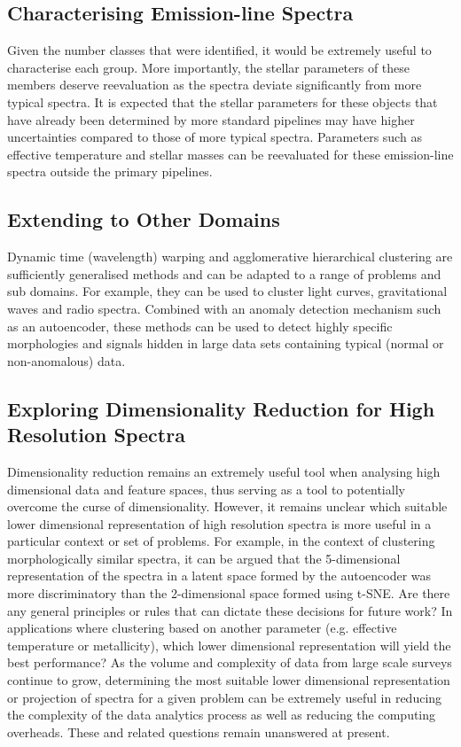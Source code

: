 \subsection{Characterising Emission-line Spectra}

Given the number classes that were identified, it would be extremely useful to characterise each group. More importantly, the stellar parameters of these members deserve reevaluation as the spectra deviate significantly from more typical spectra. It is expected that the stellar parameters for these objects that have already been determined by more standard pipelines may have higher uncertainties compared to those of more typical spectra. Parameters such as effective temperature and stellar masses can be reevaluated for these emission-line spectra outside the primary pipelines.

\subsection{Extending to Other Domains}

Dynamic time (wavelength) warping and agglomerative hierarchical clustering are sufficiently generalised methods and can be adapted to a range of problems and sub domains. For example, they can be used to cluster light curves, gravitational waves and radio spectra. Combined with an anomaly detection mechanism such as an autoencoder, these methods can be used to detect highly specific morphologies and signals hidden in large data sets containing typical (normal or non-anomalous) data. 

\subsection{Exploring Dimensionality Reduction for High Resolution Spectra}

Dimensionality reduction remains an extremely useful tool when analysing high dimensional data and feature spaces, thus serving as a tool to potentially overcome the curse of dimensionality. However, it remains unclear which suitable lower dimensional representation of high resolution spectra is more useful in a particular context or set of problems. For example, in the context of clustering morphologically similar spectra, it can be argued that the 5-dimensional representation of the spectra in a latent space formed by the autoencoder was more discriminatory than the 2-dimensional space formed using t-SNE. Are there any general principles or rules that can dictate these decisions for future work? In applications where clustering based on another parameter (e.g. effective temperature or metallicity), which lower dimensional representation will yield the best performance? As the volume and complexity of data from large scale surveys continue to grow, determining the most suitable lower dimensional representation or projection of spectra for a given problem can be extremely useful in reducing the complexity of the data analytics process as well as reducing the computing overheads. These and related questions remain unanswered at present.

